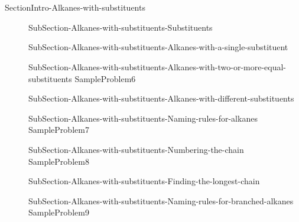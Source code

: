 \documentclass[main.tex]{subfiles}
\newcommand\chapterlabel{Ch-orgo}\setcounter{figurenewcounter}{0}\setcounter{tablenewcounter}{0}\setcounter{formulanewcounter}{0}
\begin{document}
 
\section{\color{blue!30!black}{Alkanes with substituents}}
{SectionIntro-Alkanes-with-substituents}
\vspace{10cm}{Table-Substituents}
\sloppy\begin{description}
\item[]{SubSection-Alkanes-with-substituents-Substituents}
\item[]{SubSection-Alkanes-with-substituents-Alkanes-with-a-single-substituent}
\item[]{SubSection-Alkanes-with-substituents-Alkanes-with-two-or-more-equal-substituents}
{SampleProblem6}
\item[]{SubSection-Alkanes-with-substituents-Alkanes-with-different-substituents}
\item[]{SubSection-Alkanes-with-substituents-Naming-rules-for-alkanes}
{SampleProblem7}
\item[]{SubSection-Alkanes-with-substituents-Numbering-the-chain}
{SampleProblem8}
\item[]{SubSection-Alkanes-with-substituents-Finding-the-longest-chain}
\item[]{SubSection-Alkanes-with-substituents-Naming-rules-for-branched-alkanes}
{SampleProblem9}
\end{description}
\end{document}
